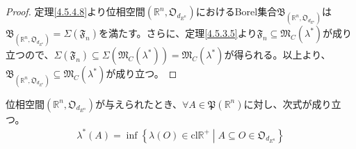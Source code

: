 \documentclass[dvipdfmx]{jsarticle}
\begin{document}
\begin{proof} 定理\ref{4.5.4.8}より位相空間$\left( \mathbb{R}^{n},\mathfrak{O}_{d_{E^{n}}} \right)$におけるBorel集合$\mathfrak{B}_{\left( \mathbb{R}^{n},\mathfrak{O}_{d_{E^{n}}} \right)}$は$\mathfrak{B}_{\left( \mathbb{R}^{n},\mathfrak{O}_{d_{E^{n}}} \right)} = \varSigma\left( \mathfrak{F}_{n} \right)$を満たす。さらに、定理\ref{4.5.3.5}より$\mathfrak{F}_{n} \subseteq \mathfrak{M}_{C}\left( \lambda^{*} \right)$が成り立つので、$\varSigma\left( \mathfrak{F}_{n} \right) \subseteq \varSigma\left( \mathfrak{M}_{C}\left( \lambda^{*} \right) \right) = \mathfrak{M}_{C}\left( \lambda^{*} \right)$が得られる。以上より、$\mathfrak{B}_{\left( \mathbb{R}^{n},\mathfrak{O}_{d_{E^{n}}} \right)} \subseteq \mathfrak{M}_{C}\left( \lambda^{*} \right)$が成り立つ。
\end{proof}
\begin{thm}\label{4.5.4.12}
位相空間$\left( \mathbb{R}^{n},\mathfrak{O}_{d_{E^{n}}} \right)$が与えられたとき、$\forall A \in \mathfrak{P}\left( \mathbb{R}^{n} \right)$に対し、次式が成り立つ。
\begin{align*}
\lambda^{*}(A) = \inf\left\{ \lambda(O) \in \mathrm{cl}\mathbb{R}^{+} \middle| A \subseteq O \in \mathfrak{O}_{d_{E^{n}}} \right\}
\end{align*}
\end{thm}
\end{document}
